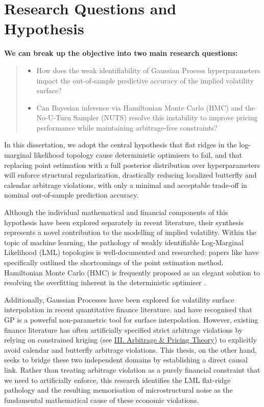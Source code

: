 \documentclass[12pt,oneside]{report}
\theoremstyle{definition}
\theoremstyle{remark}
\begin{document}
\section{Research Questions and Hypothesis}
\label{sec:hypothesis}
\textbf{We can break up the objective into two main research questions:}
\begin{quote}
\begin{itemize}
	\item How does the weak identifiability of Gaussian Process hyperparameters impact the out-of-sample predictive accuracy of the implied volatility surface?

	\item Can Bayesian inference via Hamiltonian Monte Carlo (HMC) and the No-U-Turn Sampler (NUTS) \cite{neal2011mcmc, hoffman2014nuts} resolve this instability to improve pricing performance while maintaining arbitrage-free constraints?
\end{itemize}
\end{quote}
In this dissertation, we adopt the central hypothesis that flat ridges in the log-marginal likelihood topology cause deterministic optimisers to fail, and that replacing point estimation with a full posterior distribution over hyperparameters will enforce structural regularization, drastically reducing localized butterfly and calendar arbitrage violations, with only a minimal and acceptable trade-off in nominal out-of-sample prediction accuracy.

Although the individual mathematical and financial components of this hypothesis have been explored separately in recent literature, their synthesis represents a novel contribution to the modelling of implied volatility. Within the topic of machine learning, the pathology of weakly identifiable Log-Marginal Likelihood (LML) topologies is well-documented and researched; papers like \citet{titsias_nd} have specifically outlined the shortcomings of the point estimation method. Hamiltonian Monte Carlo (HMC) is frequently proposed as an elegant solution to resolving the overfitting inherent in the deterministic optimiser \cite{neal2011mcmc}.

Additionally, Gaussian Processes have been explored for volatility surface interpolation in recent quantitative finance literature. \citet{cousin2021gp} and \citet{chataigner2021beyond} have recognised that GP is a powerful non-parametric tool for surface interpolation. However, existing finance literature has often artificially specified strict arbitrage violations by relying on constrained kriging (see \hyperref[sec:glossary_arbitrage_pricing_theory]{III. Arbitrage \& Pricing Theory}) to explicitly avoid calendar and butterfly arbitrage violations. This thesis, on the other hand, seeks to bridge these two independent domains by establishing a direct causal link. Rather than treating arbitrage violation as a purely financial constraint that we need to artificially enforce, this research identifies the LML flat-ridge pathology and the resulting memorisation of microstructural noise as the fundamental mathematical cause of these economic violations.
\end{document}
